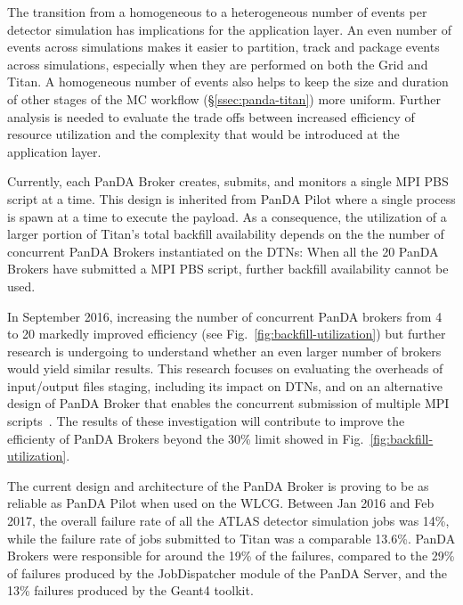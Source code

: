 The transition from a homogeneous to a heterogeneous number of events per
detector simulation has implications for the application layer. An even
number of events across simulations makes it easier to partition, track and
package events across simulations, especially when they are performed on both
the Grid and Titan. A homogeneous number of events also helps to keep the
size and duration of other stages of the MC workflow
(\S\ref{ssec:panda-titan}) more uniform. Further analysis is needed to
evaluate the trade offs between increased efficiency of resource utilization
and the complexity that would be introduced at the application layer.

Currently, each PanDA Broker creates, submits, and monitors a single MPI PBS
script at a time. This design is inherited from PanDA Pilot where a single
process is spawn at a time to execute the payload. As a consequence, the
utilization of a larger portion of Titan's total backfill availability
depends on the the number of concurrent PanDA Brokers instantiated on the
DTNs: When all the 20 PanDA Brokers have submitted a MPI PBS script, further
backfill availability cannot be used.

In September 2016, increasing the number of concurrent PanDA brokers from 4
to 20 markedly improved efficiency (see Fig.~\ref{fig:backfill-utilization})
but further research is undergoing to understand whether an even larger
number of brokers would yield similar results. This research focuses on
evaluating the overheads of input/output files staging, including its impact
on DTNs, and on an alternative design of PanDA Broker that enables the
concurrent submission of multiple MPI scripts~\cite{barreiro2016panda}. The
results of these investigation will contribute to improve the efficienty of
PanDA Brokers beyond the 30\% limit showed in
Fig.~\ref{fig:backfill-utilization}.

The current design and architecture of the PanDA Broker is proving to be as
reliable as PanDA Pilot when used on the WLCG\@. Between Jan 2016 and Feb
2017, the overall failure rate of all the ATLAS detector simulation jobs was
14\%, while the failure rate of jobs submitted to Titan was a comparable
13.6\%. PanDA Brokers were responsible for around the 19\% of the failures,
compared to the 29\% of failures produced by the JobDispatcher module of the
PanDA Server, and the 13\% failures produced by the Geant4 toolkit. 


